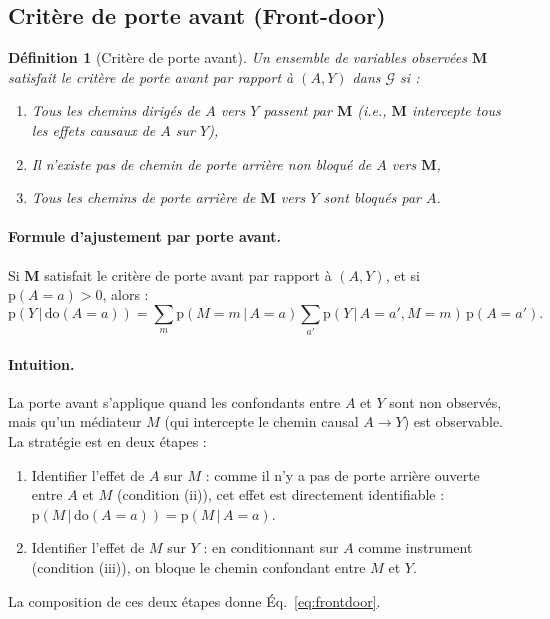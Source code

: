 \documentclass[11pt,a4paper]{article}
\newcommand{\rmdo}{\mathrm{do}}
\newcommand{\g}{\,\vert\,}
\newcommand{\pr}{\mathrm{p}}
\newtheorem{definition}{Définition}
\begin{document}
\subsection{Critère de porte avant (Front-door)}

\begin{definition}[Critère de porte avant]
Un ensemble de variables observées $\mathbf{M}$ satisfait le \emph{critère de porte avant} par rapport à $(A, Y)$ dans $\mathcal{G}$ si :
\begin{enumerate}[label=(\roman*)]
  \item Tous les chemins dirigés de $A$ vers $Y$ passent par $\mathbf{M}$ (i.e., $\mathbf{M}$ intercepte tous les effets causaux de $A$ sur $Y$),
  \item Il n'existe pas de chemin de porte arrière non bloqué de $A$ vers $\mathbf{M}$,
  \item Tous les chemins de porte arrière de $\mathbf{M}$ vers $Y$ sont bloqués par $A$.
\end{enumerate}
\end{definition}

\paragraph{Formule d'ajustement par porte avant.}
Si $\mathbf{M}$ satisfait le critère de porte avant par rapport à $(A, Y)$, et si $\pr(A=a) > 0$, alors :
\begin{equation}
  \pr(Y \g \rmdo(A=a)) = \sum_{m} \pr(M=m \g A=a) \sum_{a'} \pr(Y \g A=a', M=m)\, \pr(A=a').
  \label{eq:frontdoor}
\end{equation}

\paragraph{Intuition.}
La porte avant s'applique quand les confondants entre $A$ et $Y$ sont non observés, mais qu'un médiateur $M$ (qui intercepte le chemin causal $A \to Y$) est observable.
La stratégie est en deux étapes :
\begin{enumerate}
  \item Identifier l'effet de $A$ sur $M$ : comme il n'y a pas de porte arrière ouverte entre $A$ et $M$ (condition (ii)), cet effet est directement identifiable : $\pr(M \g \rmdo(A=a)) = \pr(M \g A=a)$.
  \item Identifier l'effet de $M$ sur $Y$ : en conditionnant sur $A$ comme instrument (condition (iii)), on bloque le chemin confondant entre $M$ et $Y$.
\end{enumerate}
La composition de ces deux étapes donne Éq.~\eqref{eq:frontdoor}.
\end{document}
